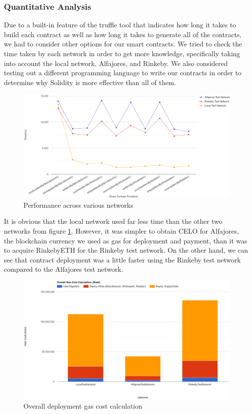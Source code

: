 \subsubsection{Quantitative Analysis}

Due to a built-in feature of the truffle tool that indicates how long it takes to build each contract as well as how long it takes to generate all of the contracts, we had to consider other options for our smart contracts. We tried to check the time taken by each network in order to get more knowledge, specifically taking into account the local network, Alfajores, and Rinkeby. We also considered testing out a different programming language to write our contracts in order to determine why Solidity is more effective than all of them.

\begin{figure}[h]
\centering
  \includegraphics[width=13.5cm]{includes/figures/graph.png} 
  \caption{Performance across various networks}
  \label{Testing on networks}
\end{figure}

\vspace{.5cm}

It is obvious that the local network used far less time than the other two networks from figure \ref{Testing on networks}. However, it was simpler to obtain CELO for Alfajores, the blockchain currency we used as gas for deployment and payment, than it was to acquire RinkebyETH for the Rinkeby test network. On the other hand, we can see that contract deployment was a little faster using the Rinkeby test network compared to the Alfajores test network.

\begin{figure}[h!]
\centering
  \includegraphics[width=12cm]{includes/figures/totalCost.png} 
  \caption{Overall deployment gas cost calculation }
  \label{Overall Gas Cost calculation}
\end{figure}

